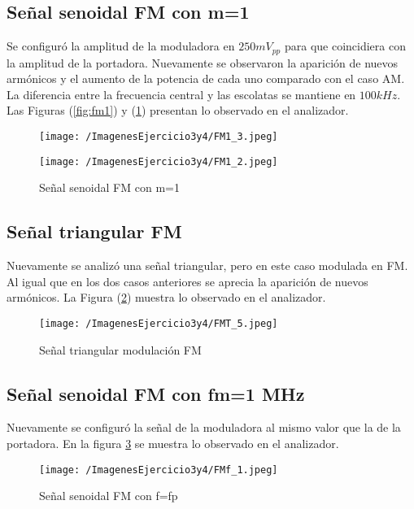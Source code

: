 \subsection{Señal senoidal FM con m=1}
Se configuró la amplitud de la moduladora en $250 mV_{pp}$ para que coincidiera con la amplitud de la portadora. Nuevamente se observaron la aparición de nuevos armónicos y el aumento de la potencia de cada uno comparado con el caso AM. La diferencia entre la frecuencia central y las escolatas se mantiene en $100 kHz$. Las Figuras (\ref{fig:fm1}) y (\ref{fig:fm1_5}) presentan lo observado en el analizador.

\begin{figure}[H]
  \centering
  \begin{minipage}[b]{0.6\textwidth}
    \texttt{[image: /ImagenesEjercicio3y4/FM1\_3.jpeg]}
    \caption{Señal senoidal FM con m=1}
    \label{fig:fm1}
  \end{minipage}
  \hfill
  \begin{minipage}[b]{0.6\textwidth}
    \texttt{[image: /ImagenesEjercicio3y4/FM1\_2.jpeg]}
    \caption{Señal senoidal FM con m=1}
    \label{fig:fm1_5}
  \end{minipage}
\end{figure}

\subsection{Señal triangular FM}
Nuevamente se analizó una señal triangular, pero en este caso modulada en FM. Al igual que en los dos casos anteriores se aprecia la aparición de nuevos armónicos. La Figura (\ref{fig:fmt1}) muestra lo observado en el analizador.

\begin{figure}[H]
	\centering
	\texttt{[image: /ImagenesEjercicio3y4/FMT\_5.jpeg]}
\caption{Señal triangular modulación FM}
	\label{fig:fmt1}
\end{figure}\textbf{}

\subsection{Señal senoidal FM con fm=1 MHz}

Nuevamente se configuró la señal de la moduladora al mismo valor que la de la portadora. En la figura \ref{fig:fmf} se muestra lo observado en el analizador.

\begin{figure}[H]
	\centering
	\texttt{[image: /ImagenesEjercicio3y4/FMf\_1.jpeg]}
\caption{Señal senoidal FM con f=fp}
	\label{fig:fmf}
\end{figure}
